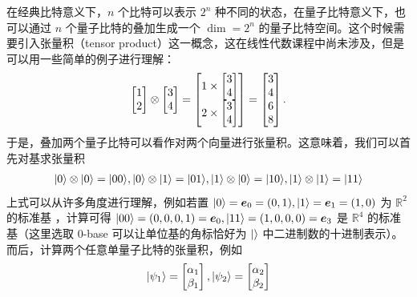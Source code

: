 在经典比特意义下，$n$ 个比特可以表示 $2^n$ 种不同的状态，在量子比特意义下，也可以通过 $n$ 个量子比特的叠加生成一个 $\dim=2^n$ 的量子比特空间。这个时候需要引入张量积（tensor product）这一概念，这在线性代数课程中尚未涉及，但是可以用一些简单的例子进行理解： \begin{align*}
    \begin{bmatrix}
        1 \\2
    \end{bmatrix}
    \otimes
    \begin{bmatrix}
        3 \\4
    \end{bmatrix}
    =
    \begin{bmatrix}
        1\times \begin{bmatrix}
                    3 \\4
                \end{bmatrix} \\
        2\times \begin{bmatrix}
                    3 \\4
                \end{bmatrix}
    \end{bmatrix}
    =
    \begin{bmatrix}
        3 \\4 \\6 \\8
    \end{bmatrix}.
\end{align*}
于是，叠加两个量子比特可以看作对两个向量进行张量积。这意味着，我们可以首先对基求张量积 \begin{align*}
    |0\rangle\otimes|0\rangle=|00\rangle,|0\rangle\otimes|1\rangle=|01\rangle,|1\rangle\otimes|0\rangle=|10\rangle,|1\rangle\otimes|1\rangle=|11\rangle
\end{align*}
上式可以从许多角度进行理解，例如若置 $|0\rangle=\bm{e}_0=(0,1),|1\rangle=\bm{e}_1=(1,0)$ 为 $\mathbb{R}^2$ 的标准基 ，计算可得 $|00\rangle=(0,0,0,1)=\bm{e}_0,|11\rangle=(1,0,0,0)=\bm{e}_3$ 是 $\mathbb{R}^4$ 的标准基（这里选取 0-base 可以让单位基的角标恰好为 $|\rangle$ 中二进制数的十进制表示）。而后，计算两个任意单量子比特的张量积，例如
\begin{align}
    |\psi_1\rangle=\begin{bmatrix}
                     \alpha_1 \\\beta_1
                 \end{bmatrix},
    |\psi_2\rangle=\begin{bmatrix}
                     \alpha_2 \\\beta_2
                 \end{bmatrix}
\end{align}

